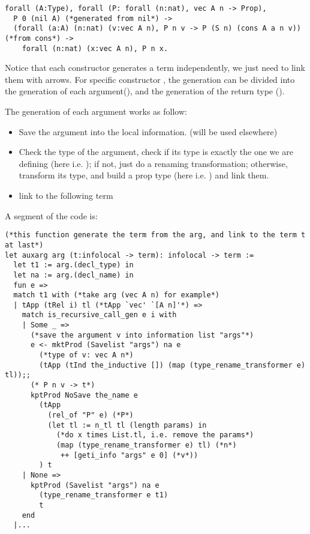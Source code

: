 \documentclass[a4paper,UKenglish,cleveref, autoref, thm-restate]{lipics-v2021}
\begin{document}
\begin{lstlisting}[language = {Coq}, basicstyle = \small]
forall (A:Type), forall (P: forall (n:nat), vec A n -> Prop),
  P 0 (nil A) (*generated from nil*) ->
  (forall (a:A) (n:nat) (v:vec A n), P n v -> P (S n) (cons A a n v)) (*from cons*) ->
    forall (n:nat) (x:vec A n), P n x.
\end{lstlisting}

Notice that each constructor generates a term independently, we just need to link them with arrows. For specific constructor , the generation can be divided into the generation of each argument(), and the generation of the return type ().

The generation of each argument works as follow:

\begin{itemize}
    \item Save the argument into the local information. (will be used elsewhere)
    \item Check the type of the argument, check if its type is exactly the one we are defining (here i.e. ); if not, just do a renaming transformation; otherwise, transform its type, and build a prop type (here i.e. ) and link them.

    \item link to the following term
\end{itemize}

A segment of the code is:

\begin{lstlisting}[language = {Coq}, basicstyle = \small]
(*this function generate the term from the arg, and link to the term t at last*)
let auxarg arg (t:infolocal -> term): infolocal -> term :=
  let t1 := arg.(decl_type) in
  let na := arg.(decl_name) in
  fun e =>
  match t1 with (*take arg (vec A n) for example*)
  | tApp (tRel i) tl (*tApp `vec' `[A n]'*) =>
    match is_recursive_call_gen e i with
    | Some _ =>
      (*save the argument v into information list "args"*)
      e <- mktProd (Savelist "args") na e
        (*type of v: vec A n*)
        (tApp (tInd the_inductive []) (map (type_rename_transformer e) tl));;
      (* P n v -> t*)    
      kptProd NoSave the_name e
        (tApp
          (rel_of "P" e) (*P*)
          (let tl := n_tl tl (length params) in 
            (*do x times List.tl, i.e. remove the params*)
            (map (type_rename_transformer e) tl) (*n*) 
             ++ [geti_info "args" e 0] (*v*))
        ) t
    | None =>
      kptProd (Savelist "args") na e
        (type_rename_transformer e t1)
        t
    end
  |...
\end{lstlisting}
\end{document}
